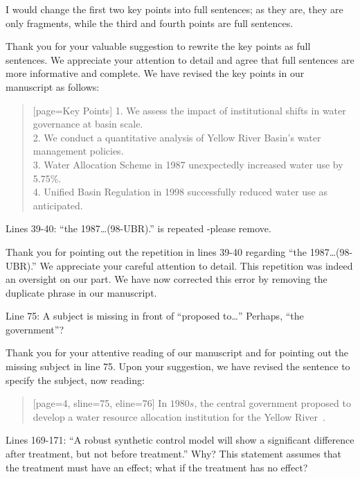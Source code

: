 \RC{} I would change the first two key points into full sentences; as they are, they are only fragments, while the third and fourth points are full sentences.

\AR{} Thank you for your valuable suggestion to rewrite the key points as full sentences. We appreciate your attention to detail and agree that full sentences are more informative and complete. We have revised the key points in our manuscript as follows:

\begin{quote}[page=Key Points]
    1.	We assess the impact of institutional shifts in water governance at basin scale.\\
    2.	We conduct a quantitative analysis of Yellow River Basin's water management policies.\\
    3.	Water Allocation Scheme in 1987 unexpectedly increased water use by 5.75\%.\\
    4.	Unified Basin Regulation in 1998 successfully reduced water use as anticipated.\\
\end{quote}

\RC{} Lines 39-40: ``the 1987\ldots (98-UBR).'' is repeated -please remove.

\AR{} Thank you for pointing out the repetition in lines 39-40 regarding ``the 1987\ldots (98-UBR).'' We appreciate your careful attention to detail. This repetition was indeed an oversight on our part. We have now corrected this error by removing the duplicate phrase in our manuscript.

\RC{} Line 75: A subject is missing in front of ``proposed to\ldots '' Perhaps, ``the government''?

\AR{} Thank you for your attentive reading of our manuscript and for pointing out the missing subject in line 75. Upon your suggestion, we have revised the sentence to specify the subject, now reading:

\begin{quote}[page=4, sline=75, eline=76]
    In $1980s$, the central government proposed to develop a water resource allocation institution for the Yellow River~\cite{wang2019d, wang2019e}.
\end{quote}

\RC{} Lines 169-171: ``A robust synthetic control model will show a significant difference after treatment, but not before treatment.'' Why? This statement assumes that the treatment must have an effect; what if the treatment has no effect?

